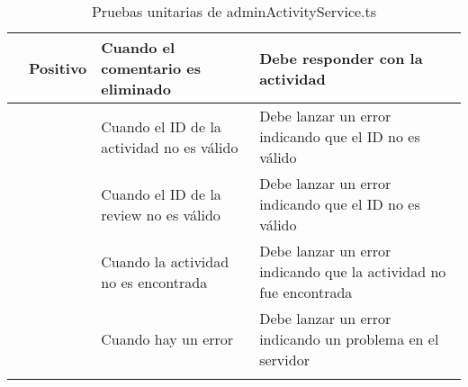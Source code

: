 \begin{small}
\begin{longtable}[H]{|>{\centering\arraybackslash}m{3cm}|>{\centering\arraybackslash}m{2cm}|>{\centering\arraybackslash}m{3cm}|>{\centering\arraybackslash}m{4cm}|}
		\multirow{5}{4cm}{Delete review}    & Positivo                    & Cuando el comentario es eliminado         & Debe responder con la actividad                                   \\
		\cline{2-4}
		                                    & \multirow{4}{3cm}{Negativo} & Cuando el ID de la actividad no es válido & Debe lanzar un error indicando que el ID no es válido             \\
		\cline{3-4}
		                                    &                             & Cuando el ID de la review no es válido    & Debe lanzar un error indicando que el ID no es válido             \\
		\cline{3-4}
		                                    &                             & Cuando la actividad no es encontrada      & Debe lanzar un error indicando que la actividad no fue encontrada \\
		\cline{3-4}
		                                    &                             & Cuando hay un error                       & Debe lanzar un error indicando un problema en el servidor         \\
		\hline
		\caption{Pruebas unitarias de adminActivityService.ts}
	\end{longtable}
\end{small}
